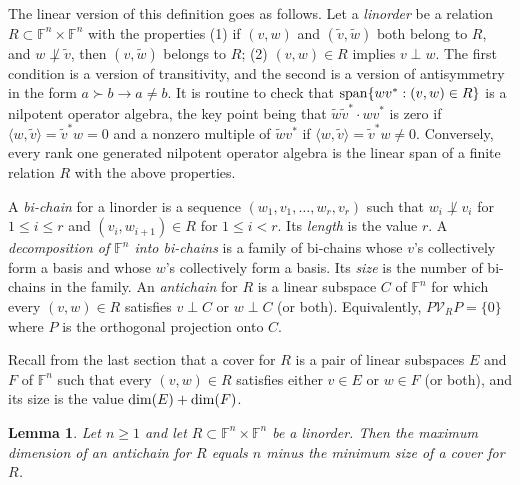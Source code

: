 \documentclass{amsart}
\newtheorem{lem}[thm]{Lemma}
\theoremstyle{definition}
\begin{document}
The linear version of this definition goes as follows. Let a {\it linorder} be a relation $R \subset \mathbb{F}^n \times \mathbb{F}^n$ with the properties (1) if $(v,w)$ and $(\tilde{v}, \tilde{w})$ both belong to $R$, and $w \not\perp \tilde{v}$, then $(v, \tilde{w})$ belongs to $R$; (2) $(v,w) \in R$ implies $v \perp w$. The first condition is a version of transitivity, and the second is a version of antisymmetry in the form $a \succ b \to a \neq b$. It is routine to check that ${\rm span}\{wv^*: (v,w) \in R\}$ is a nilpotent operator algebra, the key point being that $\tilde{w}\tilde{v}^*\cdot wv^*$ is zero if $\langle w, \tilde{v}\rangle = \tilde{v}^*w = 0$ and a nonzero multiple of $\tilde{w}v^*$ if $\langle w, \tilde{v}\rangle  = \tilde{v}^*w \neq 0$. Conversely, every rank one generated nilpotent operator algebra is the linear span of a finite relation $R$ with the above properties.

A {\it bi-chain} for a linorder is a sequence $(w_1, v_1, \ldots, w_r, v_r)$ such that $w_i \not\perp v_i$ for $1 \leq i \leq r$ and $(v_i, w_{i+1}) \in R$ for $1 \leq i < r$. Its {\it length} is the value $r$. A {\it decomposition of $\mathbb{F}^n$ into bi-chains} is a family of bi-chains whose $v$'s collectively form a basis and whose $w$'s collectively form a basis. Its {\it size} is the number of bi-chains in the family. An {\it antichain} for $R$ is a linear subspace $C$ of $\mathbb{F}^n$ for which every $(v,w) \in R$ satisfies $v \perp C$ or $w \perp C$ (or both). Equivalently, $P\mathcal{V}_R P = \{0\}$ where $P$ is the orthogonal projection onto $C$.

Recall from the last section that a cover for $R$ is a pair of linear subspaces $E$ and $F$ of $\mathbb{F}^n$ such that every $(v,w) \in R$ satisfies either $v \in E$ or $w \in F$ (or both), and its size is the value ${\rm dim}(E) + {\rm dim}(F)$.

\begin{lem}\label{dillem}
Let $n \geq 1$ and let $R \subset \mathbb{F}^n\times\mathbb{F}^n$ be a linorder. Then the maximum dimension of an antichain for $R$ equals $n$ minus the minimum size of a cover for $R$.
\end{lem}
\end{document}
